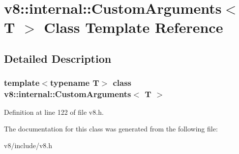 \hypertarget{classv8_1_1internal_1_1CustomArguments}{}\section{v8\+:\+:internal\+:\+:Custom\+Arguments$<$ T $>$ Class Template Reference}
\label{classv8_1_1internal_1_1CustomArguments}


\subsection{Detailed Description}
\subsubsection*{template$<$typename T$>$\newline
class v8\+::internal\+::\+Custom\+Arguments$<$ T $>$}



Definition at line 122 of file v8.\+h.



The documentation for this class was generated from the following file\+:\begin{DoxyCompactItemize}
\item 
v8/include/v8.\+h\end{DoxyCompactItemize}
